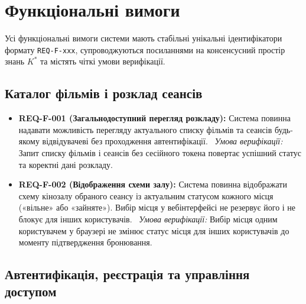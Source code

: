 \section{Функціональні вимоги}\label{sec:funktsional}

Усі функціональні вимоги системи мають стабільні унікальні ідентифікатори формату \texttt{REQ-F-xxx}, супроводжуються посиланнями на консенсусний простір знань $K^*$ та містять чіткі умови верифікації.

\subsection{Каталог фільмів і розклад сеансів}\label{sec:funktsional-katalog}

\begin{itemize}[leftmargin=*,labelindent=0pt]
    \item \textbf{REQ-F-001 (Загальнодоступний перегляд розкладу):} Система повинна надавати можливість перегляду актуального списку фільмів та сеансів будь-якому відвідувачеві без проходження автентифікації.~
    \textit{Умова верифікації:} Запит списку фільмів і сеансів без сесійного токена повертає успішний статус та коректні дані розкладу.
    
    \item \textbf{REQ-F-002 (Відображення схеми залу):} Система повинна відображати схему кінозалу обраного сеансу із актуальним статусом кожного місця («вільне» або «зайняте»). Вибір місця у вебінтерфейсі не резервує його і не блокує для інших користувачів.~
    \textit{Умова верифікації:} Вибір місця одним користувачем у браузері не змінює статус місця для інших користувачів до моменту підтвердження бронювання.
\end{itemize}

\subsection{Автентифікація, реєстрація та управління доступом}\label{sec:funktsional-auth}

